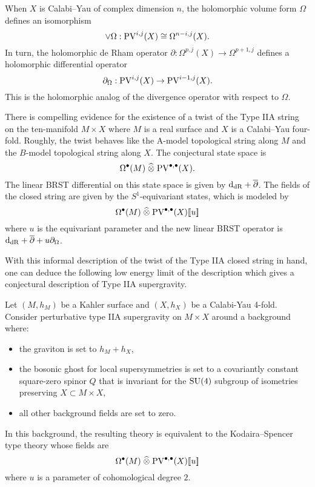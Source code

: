 \documentclass[11pt]{amsart}
\def\pv{{\rm PV}}
\def\PV{{\rm PV}}
\begin{document}
When $X$ is Calabi--Yau of complex dimension $n$, the holomorphic volume form $\Omega$ defines an isomorphism
\[
  \vee \Omega : \pv^{i,j}(X) \cong \Omega^{n-i, j}(X).
\]
In turn, the holomorphic de Rham operator $\partial : \Omega^{p, j}(X) \to \Omega^{p+1,j}$ defines a holomorphic differential operator
\[
  \partial_{\Omega} : \pv^{i,j}(X) \to \pv^{i-1,j}(X) .
\]
This is the holomorphic analog of the divergence operator with respect to $\Omega$.

There is compelling evidence \cite{CLsugra} for the existence of a twist of the Type IIA string on the ten-manifold $M \times X$ where $M$ is a real surface and $X$ is a Calabi--Yau four-fold.
Roughly, the twist behaves like the A-model topological string along $M$ and the $B$-model topological string along $X$.
The conjectural state space is
\[
  \Omega^\bu(M) \; \Hat{\otimes} \; \PV^{\bu, \bu} (X) .
\]
The linear BRST differential on this state space is given by ${\rm d}_{\rm dR} + \overline{\partial}$.
The fields of the closed string are given by the $S^1$-equivariant states, which is modeled \cite{CLbcov} by
\[
  \Omega^\bu(M) \; \Hat{\otimes} \; \PV^{\bu, \bu} (X) [\![u]\!]
\]
where $u$ is the equivariant parameter and the new linear BRST operator is ${\rm d}_{\rm dR} + \overline{\partial} + u \partial_\Omega$.

With this informal description of the twist of the Type IIA closed string in hand, one can deduce the following low energy limit of the description which gives a conjectural description of Type IIA supergravity.

\begin{conj}
  Let $(M,h_{M})$ be a Kahler surface and $(X, h_{X})$ be a Calabi-Yau 4-fold.
  Consider perturbative type IIA supergravity on $M\times X$ around a background where:
  \begin{itemize}
    \item the graviton is set to $h_{M}+ h_{X}$,
    \item the bosonic ghost for local supersymmetries is set to a covariantly constant square-zero spinor $Q$ that is invariant for the $\rm SU(4)$ subgroup of isometries preserving $X\subset M\times X$,
    \item all other background fields are set to zero.
  \end{itemize}
  In this background, the resulting theory is equivalent to the Kodaira--Spencer type theory whose fields are
  \[
    \Omega^{\bullet}(M) \; \Hat{\otimes} \; \PV^{\bullet, \bullet}(X)[\![u]\!]
  \]
  where $u$ is a parameter of cohomological degree $2$.
\end{conj}
\end{document}

